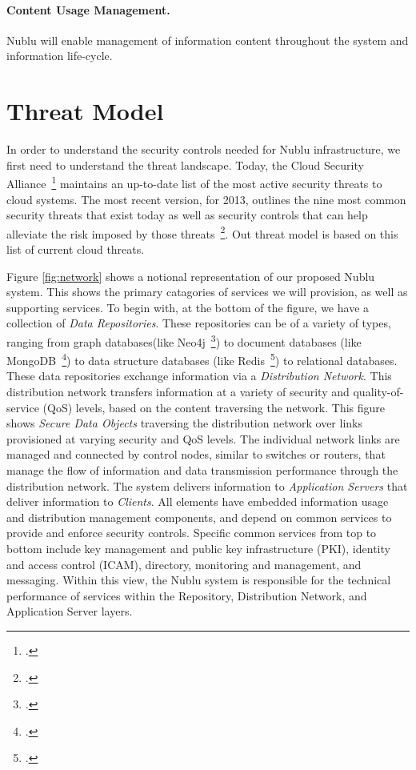 \documentclass[10pt,letterpaper]{article}
\begin{document}
\paragraph{Content Usage Management.} Nublu will enable management of information content throughout the system and information life-cycle.

\section{Threat Model}
\label{sec:threat-model}
In order to understand the security controls needed for Nublu infrastructure, we first need to understand the threat landscape.  Today, the Cloud Security Alliance~\footcite{csa} maintains an up-to-date list of the most active security threats to cloud systems.  The most recent version, for 2013, outlines the nine most common security threats that exist today as well as security controls that can help alleviate the risk imposed by those threats~\footcite{csa-noni:13}.  Out threat model is based on this list of current cloud threats.


Figure \ref{fig:network} shows a notional representation of our proposed Nublu system.  This shows the primary catagories of services we will provision, as well as supporting services.  To begin with, at the bottom of the figure, we have a collection of {\sl Data Repositories}.  These repositories can be of a variety of types, ranging from graph databases(like Neo4j~\footcite{neo4j}) to document databases (like MongoDB~\footcite{mongodb}) to data structure databases (like Redis~\footcite{redis}) to relational databases. These data repositories exchange information via a {\sl Distribution Network}.  This distribution network transfers information at a variety of security and quality-of-service (QoS) levels, based on the content traversing the network.  This figure shows {\sl Secure Data Objects} traversing the distribution network over links provisioned at varying security and QoS levels.  The individual network links are managed and connected by control nodes, similar to switches or routers, that manage the flow of information and data transmission performance through the distribution network.  The system delivers information to {\sl Application Servers} that deliver information to {\sl Clients}.  All elements have embedded information usage and distribution management components, and depend on common services to provide and enforce security controls.  Specific common services from top to bottom include key management and public key infrastructure (PKI), identity and access control (ICAM), directory, monitoring and management, and messaging.  Within this view, the Nublu system is responsible for the technical performance of services within the Repository, Distribution Network, and Application Server layers.
\end{document}
